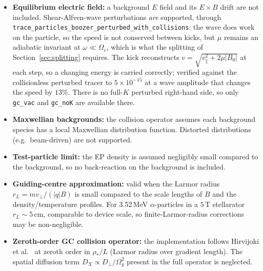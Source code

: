 \documentclass[11pt]{article}
\newcommand{\vpar}{v_{\!\parallel}}
\begin{document}
\begin{itemize}
  \item \textbf{Equilibrium electric field:} a background $E$ field and its
        $E\times B$ drift are not included.  Shear-Alfven-wave perturbations
        \emph{are} supported, through
        \texttt{trace\_particles\_boozer\_perturbed\_with\_collisions}: the
        wave does work on the particle, so the speed is not conserved between
        kicks, but $\mu$ remains an adiabatic invariant at
        $\omega\ll\Omega_c$, which is what the splitting of
        Section~\ref{sec:splitting} requires.  The kick reconstructs
        $v=\sqrt{\vpar^2+2\mu|B_0|}$ at each step, so a changing energy is
        carried correctly; verified against the collisionless perturbed
        tracer to $5\times10^{-15}$ at a wave amplitude that changes the
        speed by $13\%$.  There is no full-$K$ perturbed right-hand side, so
        only \texttt{gc\_vac} and \texttt{gc\_noK} are available there.

  \item \textbf{Maxwellian backgrounds:} the collision operator assumes each
        background species has a local Maxwellian distribution function.  Distorted
        distributions (e.g.\ beam-driven) are not supported.

  \item \textbf{Test-particle limit:} the EP density is assumed negligibly small
        compared to the background, so no back-reaction on the background is included.

  \item \textbf{Guiding-centre approximation:} valid when the Larmor radius
        $r_L = mv_\perp/(|q|B)$ is small compared to the scale lengths of $B$ and the
        density/temperature profiles.  For 3.52\,MeV $\alpha$-particles in a
        $5$\,T stellarator $r_L\sim 5$\,cm, comparable to device scale, so
        finite-Larmor-radius corrections may be non-negligible.

  \item \textbf{Zeroth-order GC collision operator:} the implementation follows
        Hirvijoki et al.\ \cite{hirvijoki2013} at zeroth order in $\rho_*/L$
        (Larmor radius over gradient length).  The spatial diffusion term
        $D_X \propto D_\perp/\Omega_g^2$ present in the full operator
        \cite{hirvijoki2014} is neglected.


\end{itemize}
\end{document}
